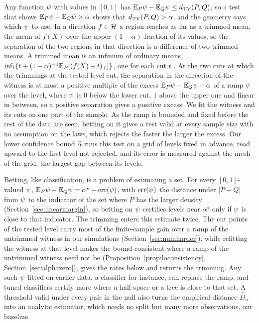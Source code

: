 Any function $\psi$ with values in $[0,1]$ has $\mathbb{E}_P\psi-\mathbb{E}_Q\psi\le d_{\mathrm{TV}}(P,Q)$, so a test that shows
$\mathbb{E}_P\psi-\mathbb{E}_Q\psi>\alpha$ shows that $d_{\mathrm{TV}}(P,Q)>\alpha$, and the geometry says which $\psi$ to use. In a direction
$f\in\mathcal{H}$ a region reaches as far as a trimmed mean, the mean of $f(X)$ over the upper $(1-\alpha)$-fraction of its
values, so the separation of the two regions in that direction is a difference of two trimmed means. A trimmed mean is
an infimum of ordinary means, $\inf_t\{t+(1-\alpha)^{-1}\mathbb{E}_P[(f(X)-t)_+]\}$, one for each cut $t$
\citep{rockafellaruryasev2000}. At the two cuts at which the trimmings at the tested level cut, the separation in the
direction of the witness is at most a positive multiple of the excess $\mathbb{E}_P\psi-\mathbb{E}_Q\psi-\alpha$ of a ramp $\psi$ over the
level, where $\psi$ is $0$ below the lower cut, $1$ above the upper one and linear in between, so a positive separation
gives a positive excess. We fit the witness and its cuts on one part of the sample. As the ramp is bounded and fixed
before the rest of the data are seen, betting on it gives a test valid at every sample size with no assumption on the
laws, which rejects the faster the larger the excess. Our
lower confidence bound $\widehat\alpha$ runs this test on a grid of levels fixed in advance, read upward to the first
level not rejected, and its error is measured against the mesh of the grid, the largest gap between its levels.

Betting, like classification, is a problem of estimating a set. For every $[0,1]$-valued $\psi$,
$\mathbb{E}_P\psi-\mathbb{E}_Q\psi=\alpha^\star-\mathrm{err}(\psi)$, with $\mathrm{err}(\psi)$ the distance under $|P-Q|$ from $\psi$ to the
indicator of the set where $P$ has the larger density (Section~\ref{sec:linearmargin}), so betting on $\psi$ certifies
levels near $\alpha^\star$ only if $\psi$ is close to that indicator. The trimming enters this estimate twice. The cut
points of the tested level carry most of the finite-sample gain over a ramp of the untrimmed witness in our simulations
(Section~\ref{sec:numharder}), while refitting the witness at that level makes the bound consistent where a ramp of the
untrimmed witness need not be (Proposition~\ref{prop:loconsistency}, Section~\ref{sec:alphazero}), gives the rates
below and returns the trimming. Any such $\psi$ fitted on earlier data, a classifier for instance, can replace the
ramp, and tuned classifiers certify more where a half-space or a tree is close to that set. A threshold valid under
every pair in the null also turns the empirical distance $\widehat D_\alpha$ into an analytic estimator, which needs no
split but many more observations, our baseline.

